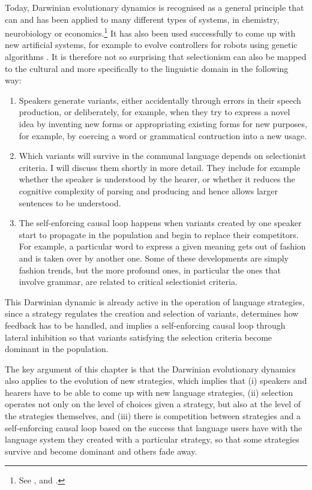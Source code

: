 Today, Darwinian evolutionary dynamics 
is recognised as a general principle that can and has been applied to 
many different types of systems, in chemistry, neurobiology or 
economics.\footnote{See \cite{Arthur:1996}, \cite{Edelman:1987} and \cite{Luisi:2001}.}
It has also been used successfully to come up 
with new artificial systems, for example to evolve controllers for robots using 
genetic algorithms \citep{Nolfi:2000}. It is therefore not so surprising that 
selectionism can also be mapped to the cultural and more specifically to the linguistic domain in the following way: 
\begin{enumerate}
\item Speakers generate variants, either accidentally through errors in their speech production, or deliberately, 
for example, when they try to express a novel idea by inventing new forms or 
appropriating existing forms for new purposes, for example, by coercing a word or grammatical contruction into a new usage. 
\item Which variants will survive in the communal language depends on selectionist criteria. I will 
discuss them shortly in more detail. They include for example whether the speaker is understood by the hearer, or whether 
it reduces the cognitive complexity of parsing and producing and hence allows larger sentences to be understood. 
\item The self-enforcing causal loop happens when variants created by one speaker start to propagate in the population 
and begin to replace their competitors. For example, a particular word to express a given meaning gets out of fashion 
and is taken over by another one. Some of these developments are simply fashion trends, but the more profound ones, 
in particular the ones that involve grammar, are related to critical selectionist criteria. 
\end{enumerate}
This Darwinian dynamic is already active in the operation of language strategies, since  a strategy regulates the 
creation and selection of variants, determines how feedback has to be handled, and implies a self-enforcing causal loop through 
lateral inhibition so that variants satisfying the selection criteria become 
dominant in the population. 

The key argument of this chapter is that the Darwinian evolutionary dynamics
also applies to the evolution of new strategies, which implies that (i) speakers and 
hearers have to be able to come up with new language strategies, (ii) selection operates not only on the level of choices given 
a strategy, but also at the level of the strategies themselves, and (iii) there is competition between strategies 
and a self-enforcing causal loop based on the success that language users have with the language system they created 
with a particular strategy, so that some strategies survive and become dominant and others fade away. 

